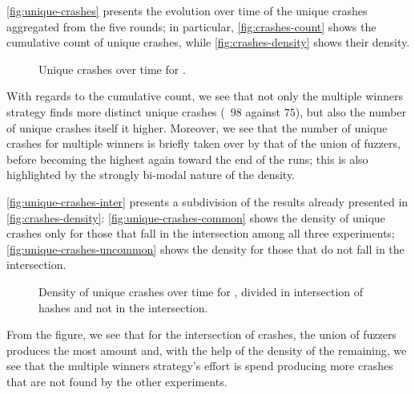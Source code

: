 \autoref{fig:unique-crashes} presents the evolution over time of the unique
crashes aggregated from the five rounds; in particular,
\autoref{fig:crashes-count} shows the cumulative count of unique crashes, while
\autoref{fig:crashes-density} shows their density.

\begin{figure}[h]
    \centering%
    \caption{Unique crashes over time for \listswf.}
    \label{fig:unique-crashes}
\end{figure}

With regards to the cumulative count, we see that not only the multiple winners
strategy finds more distinct unique crashes (\ie~$98$ against $75$), but also
the number of unique crashes itself it higher. Moreover, we see that the number
of unique crashes for multiple winners is briefly taken over by that of the
union of fuzzers, before becoming the highest again toward the end of the runs;
this is also highlighted by the strongly bi-modal nature of the density.

\autoref{fig:unique-crashes-inter} presents a subdivision of the results already
presented in \autoref{fig:crashes-density}: \autoref{fig:unique-crashes-common}
shows the density of unique crashes only for those that fall in the intersection
among all three experiments; \autoref{fig:unique-crashes-uncommon} shows the
density for those that do not fall in the intersection.

\begin{figure}[h]
    \centering%
    \caption{Density of unique crashes over time for \listswf, divided in
    intersection of hashes and not in the intersection.}
    \label{fig:unique-crashes-inter}
\end{figure}

From the figure, we see that for the intersection of crashes, the union of
fuzzers produces the most amount and, with the help of the density of the
remaining, we see that the multiple winners strategy's effort is spend producing
more crashes that are not found by the other experiments.

